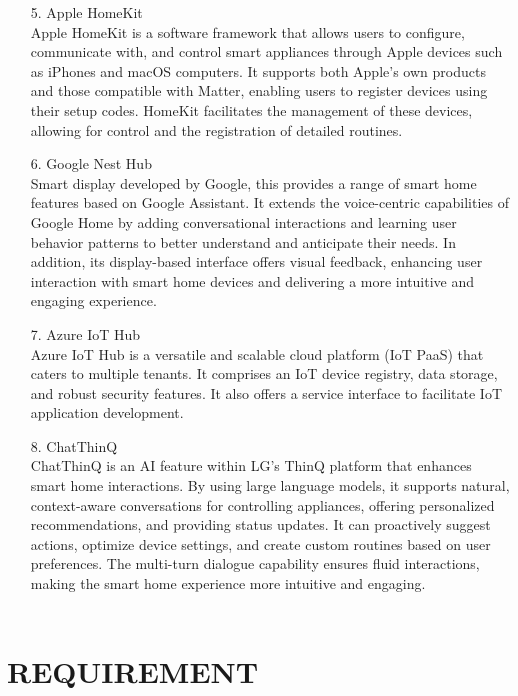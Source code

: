 \documentclass[conference]{IEEEtran}
\begin{document}
\begin{itemize}
\\
\item [5.]Apple HomeKit\\
Apple HomeKit is a software framework that allows users to configure, communicate with, and control smart appliances through Apple devices such as iPhones and macOS computers. It supports both Apple’s own products and those compatible with Matter, enabling users to register devices using their setup codes. HomeKit facilitates the management of these devices, allowing for control and the registration of detailed routines.
\\
\item [6.]Google Nest Hub\\
Smart display developed by Google, this provides a range of smart home features based on Google Assistant. It extends the voice-centric capabilities of Google Home by adding conversational interactions and learning user behavior patterns to better understand and anticipate their needs. In addition, its display-based interface offers visual feedback, enhancing user interaction with smart home devices and delivering a more intuitive and engaging experience.
\\
\item [7.]Azure IoT Hub\\
Azure IoT Hub is a versatile and scalable cloud platform (IoT PaaS) that caters to multiple tenants. It comprises an IoT device registry, data storage, and robust security features. It also offers a service interface to facilitate IoT application development.
\\
\item [8.]ChatThinQ\\
ChatThinQ is an AI feature within LG's ThinQ platform that enhances smart home interactions. By using large language models, it supports natural, context-aware conversations for controlling appliances, offering personalized recommendations, and providing status updates. It can proactively suggest actions, optimize device settings, and create custom routines based on user preferences. The multi-turn dialogue capability ensures fluid interactions, making the smart home experience more intuitive and engaging. \\ \\

\end{itemize}


\section{REQUIREMENT}
\end{document}
